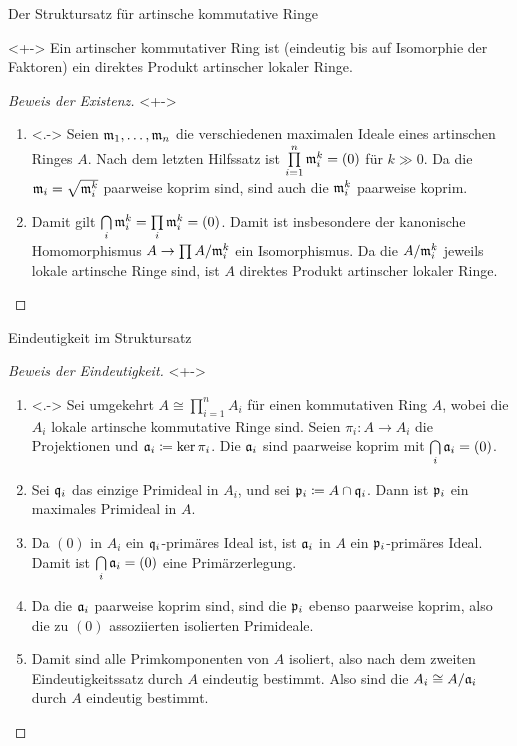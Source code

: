 \begin{frame}{Der Struktursatz für artinsche kommutative Ringe}
	\begin{theorem}<+->
		\label{thm:artin_structure}
		Ein artinscher kommutativer Ring ist (eindeutig bis auf Isomorphie
		der Faktoren) ein direktes Produkt artinscher lokaler
		Ringe.
	\end{theorem}
	\begin{proof}[Beweis der Existenz]<+->
		\renewcommand{\qedsymbol}{}
		\begin{enumerate}[<+->]
		\item<.->
			Seien \(\mathfrak{m}_1, \dotsc, \mathfrak{m}_n\) die verschiedenen maximalen
			Ideale eines artinschen Ringes \(A\). Nach dem letzten Hilfssatz
			ist \(\prod\limits_{i = 1}^n \mathfrak{m}_i^k = (0)\) für \(k \gg 0\).
			Da die \(\mathfrak{m}_i = \sqrt{\mathfrak{m}_i^k}\) paarweise koprim sind,
			sind auch die \(\mathfrak{m}_i^k\) paarweise koprim.
		\item
			Damit gilt \(\bigcap\limits_i \mathfrak{m}_i^k
			= \prod\limits_i \mathfrak{m}_i^k = (0)\). Damit ist insbesondere
			der kanonische Homomorphismus \(A \to \prod\limits A/\mathfrak{m}_i^k\)
			ein Isomorphismus. Da die \(A/\mathfrak{m}_i^k\) jeweils lokale
			artinsche Ringe sind, ist \(A\) direktes Produkt artinscher lokaler
			Ringe.
			\qedhere
		\end{enumerate}
	\end{proof}
\end{frame}

\begin{frame}{Eindeutigkeit im Struktursatz}
	\begin{proof}[Beweis der Eindeutigkeit]<+->
		\begin{enumerate}[<+->]
		\item<.->
			Sei umgekehrt \(A \cong \prod\limits_{i = 1}^n A_i\) für einen
			kommutativen Ring \(A\), wobei die
			\(A_i\) lokale artinsche kommutative Ringe sind. Seien
			\(\pi_i\colon A \to A_i\) die Projektionen und \(\mathfrak{a}_i
			\coloneqq \ker\pi_i\). Die \(\mathfrak{a}_i\) sind paarweise koprim
			mit \(\bigcap\limits_i \mathfrak{a}_i = (0)\).
		\item
			Sei \(\mathfrak{q}_i\) das einzige Primideal in \(A_i\), und sei
			\(\mathfrak{p}_i \coloneqq A \cap \mathfrak{q}_i\). Dann ist \(\mathfrak{p}_i\)
			ein maximales Primideal in \(A\).
		\item
			Da \((0)\) in \(A_i\) ein \(\mathfrak{q}_i\)-primäres Ideal ist, ist \(\mathfrak{a}_i\) in \(A\)
			ein \(\mathfrak{p}_i\)-primäres Ideal. Damit ist \(\bigcap\limits_i
			\mathfrak{a}_i = (0)\) eine Primärzerlegung.
		\item
			Da die \(\mathfrak{a}_i\) paarweise koprim sind, sind die \(\mathfrak{p}_i\)
			ebenso paarweise koprim, also die zu \((0)\)
			assoziierten isolierten Primideale.
		\item
			Damit sind alle Primkomponenten von \(A\) isoliert, also nach
			dem zweiten Eindeutigkeitssatz durch \(A\) eindeutig bestimmt.
			Also sind die \(A_i \cong A/\mathfrak{a}_i\) durch \(A\) eindeutig
			bestimmt.
			\qedhere
		\end{enumerate}
	\end{proof}
\end{frame}

